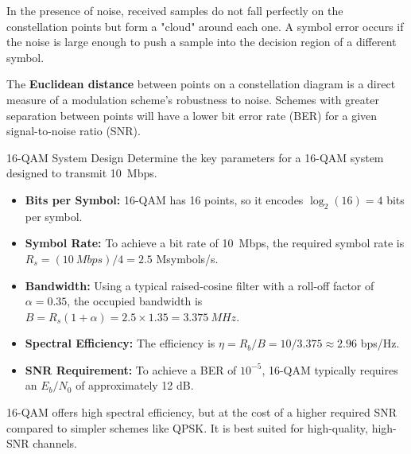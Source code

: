 In the presence of noise, received samples do not fall perfectly on the constellation points but form a "cloud" around each one. A symbol error occurs if the noise is large enough to push a sample into the decision region of a different symbol.

\begin{keyconcept}
    The \textbf{Euclidean distance} between points on a constellation diagram is a direct measure of a modulation scheme's robustness to noise. Schemes with greater separation between points will have a lower bit error rate (BER) for a given signal-to-noise ratio (SNR).
\end{keyconcept}

\begin{workedexample}{16-QAM System Design}
     Determine the key parameters for a 16-QAM system designed to transmit \qty{10}{Mbps}.
    \begin{itemize}
        \item \textbf{Bits per Symbol:} 16-QAM has 16 points, so it encodes $\log_2(16) = 4$ bits per symbol.
        \item \textbf{Symbol Rate:} To achieve a bit rate of \qty{10}{Mbps}, the required symbol rate is $R_s = (\qty{10}{Mbps}) / 4 = 2.5$ Msymbols/s.
        \item \textbf{Bandwidth:} Using a typical raised-cosine filter with a roll-off factor of $\alpha = 0.35$, the occupied bandwidth is $B = R_s(1 + \alpha) = 2.5 \times 1.35 = \qty{3.375}{MHz}$.
        \item \textbf{Spectral Efficiency:} The efficiency is $\eta = R_b / B = 10 / 3.375 \approx 2.96$ bps/Hz.
        \item \textbf{SNR Requirement:} To achieve a BER of $10^{-5}$, 16-QAM typically requires an $E_b/N_0$ of approximately 12 dB.
    \end{itemize}
     16-QAM offers high spectral efficiency, but at the cost of a higher required SNR compared to simpler schemes like QPSK. It is best suited for high-quality, high-SNR channels.
\end{workedexample}

